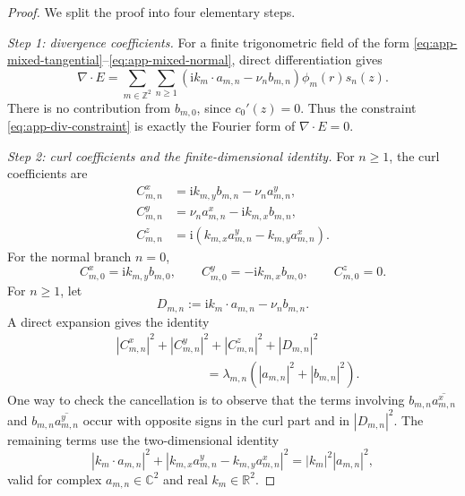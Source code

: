 \documentclass[10pt,a4paper]{amsart}
\providecommand{\C}{\mathbb{C}}
\providecommand{\R}{\mathbb{R}}
\providecommand{\Z}{\mathbb{Z}}
\providecommand{\abs}[1]{\left\lvert #1\right\rvert}
\providecommand{\ii}{\mathrm{i}}
\providecommand{\paren}[1]{\left(#1\right)}
\begin{document}
\begin{proof}
We split the proof into four elementary steps.

\emph{Step 1: divergence coefficients.}
For a finite trigonometric field of the form
\eqref{eq:app-mixed-tangential}--\eqref{eq:app-mixed-normal}, direct
differentiation gives
\begin{equation}
\label{eq:app-div-expansion}
    \nabla\cdot E
    =
    \sum_{m\in\Z^2}\sum_{n\ge1}
    \paren{\ii k_m\cdot a_{m,n}-\nu_n b_{m,n}}
    \phi_m(r)s_n(z).
\end{equation}
There is no contribution from \(b_{m,0}\), since \(c_0'(z)=0\).  Thus the
constraint \eqref{eq:app-div-constraint} is exactly the Fourier form of
\(\nabla\cdot E=0\).

\emph{Step 2: curl coefficients and the finite-dimensional identity.}
For \(n\ge1\), the curl coefficients are
\begin{align}
\label{eq:app-curl-coeffs-positive-n}
    C^x_{m,n}&=\ii k_{m,y}b_{m,n}-\nu_n a^y_{m,n},\nonumber\\
    C^y_{m,n}&=\nu_n a^x_{m,n}-\ii k_{m,x}b_{m,n},\\
    C^z_{m,n}&=\ii\paren{k_{m,x}a^y_{m,n}-k_{m,y}a^x_{m,n}}.\nonumber
\end{align}
For the normal branch \(n=0\),
\begin{equation}
\label{eq:app-curl-coeffs-zero-n}
    C^x_{m,0}=\ii k_{m,y}b_{m,0},
    \qquad
    C^y_{m,0}=-\ii k_{m,x}b_{m,0},
    \qquad
    C^z_{m,0}=0 .
\end{equation}
For \(n\ge1\), let
\[
    D_{m,n}:=\ii k_m\cdot a_{m,n}-\nu_n b_{m,n} .
\]
A direct expansion gives the identity
\begin{align}
\label{eq:app-curl-div-identity}
    &\abs{C^x_{m,n}}^2+
     \abs{C^y_{m,n}}^2+
     \abs{C^z_{m,n}}^2+
     \abs{D_{m,n}}^2        \\
    &\hspace{3cm}=
     \lambda_{m,n}
     \paren{\abs{a_{m,n}}^2+\abs{b_{m,n}}^2} .\nonumber
\end{align}
One way to check the cancellation is to observe that the terms involving
\(b_{m,n}\overline{a^x_{m,n}}\) and \(b_{m,n}\overline{a^y_{m,n}}\) occur with
opposite signs in the curl part and in \(\abs{D_{m,n}}^2\).  The remaining
terms use the two-dimensional identity
\[
    \abs{k_m\cdot a_{m,n}}^2+
    \abs{k_{m,x}a^y_{m,n}-k_{m,y}a^x_{m,n}}^2
    =
    \abs{k_m}^2\abs{a_{m,n}}^2,
\]
valid for complex \(a_{m,n}\in\C^2\) and real \(k_m\in\R^2\).


\end{proof}
\end{document}
